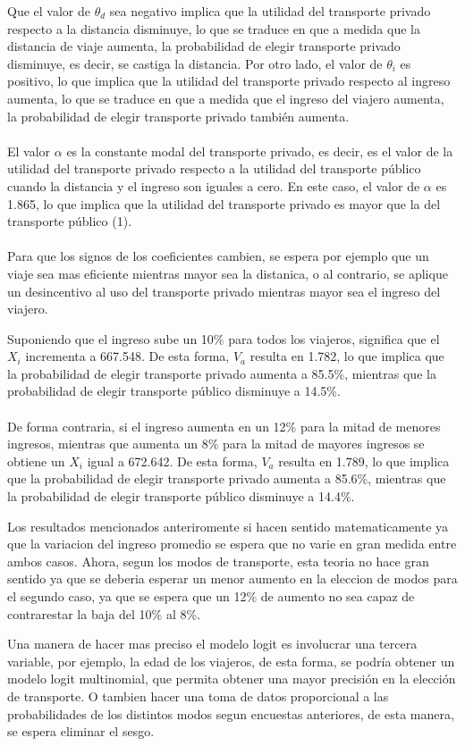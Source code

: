 Que el valor de $\theta_{d}$ sea negativo implica que la utilidad del transporte privado respecto a la distancia disminuye, lo que se traduce en que a medida que la distancia de viaje aumenta, la probabilidad de elegir transporte privado disminuye, es decir, se castiga la distancia.
Por otro lado, el valor de $\theta_{i}$ es positivo, lo que implica que la utilidad del transporte privado respecto al ingreso aumenta, lo que se traduce en que a medida que el ingreso del viajero aumenta, la probabilidad de elegir transporte privado también aumenta.
\\ \\
El valor $\alpha$ es la constante modal del transporte privado, es decir, es el valor de la utilidad del transporte privado respecto a la utilidad del transporte público cuando la distancia y el ingreso son iguales a cero. En este caso, el valor de $\alpha$ es 1.865, lo que implica que la utilidad del transporte privado es mayor que la del transporte público (1).
\\ \\
Para que los signos de los coeficientes cambien, se espera por ejemplo que un viaje sea mas eficiente mientras mayor sea la distanica, o al contrario, se aplique un desincentivo al uso del transporte privado mientras mayor sea el ingreso del viajero.


Suponiendo que el ingreso sube un 10\% para todos los viajeros, significa que el $X_i$ incrementa a 667.548. De esta forma, $V_a$ resulta en 1.782, lo que implica que la probabilidad de elegir transporte privado aumenta a 85.5\%, mientras que la probabilidad de elegir transporte público disminuye a 14.5\%.
\\ \\
De forma contraria, si el ingreso aumenta en un 12\% para la mitad de menores ingresos, mientras que aumenta un 8\% para la mitad de mayores ingresos se obtiene un $X_i$ igual a 672.642. De esta forma, $V_a$ resulta en 1.789, lo que implica que la probabilidad de elegir transporte privado aumenta a 85.6\%, mientras que la probabilidad de elegir transporte público disminuye a 14.4\%.


Los resultados mencionados anteriromente si hacen sentido matematicamente ya que la variacion del ingreso promedio se espera que no varie en gran medida entre ambos casos. Ahora, segun los modos de transporte, esta teoria no hace gran sentido ya que se deberia esperar un menor aumento en la eleccion de modos para el segundo caso, ya que se espera que un 12\% de aumento no sea capaz de contrarestar la baja del 10\% al 8\%.


Una manera de hacer mas preciso el modelo logit es involucrar una tercera variable, por ejemplo, la edad de los viajeros, de esta forma, se podría obtener un modelo logit multinomial, que permita obtener una mayor precisión en la elección de transporte. O tambien hacer una toma de datos proporcional a las probabilidades de los distintos modos segun encuestas anteriores, de esta manera, se espera eliminar el sesgo.

